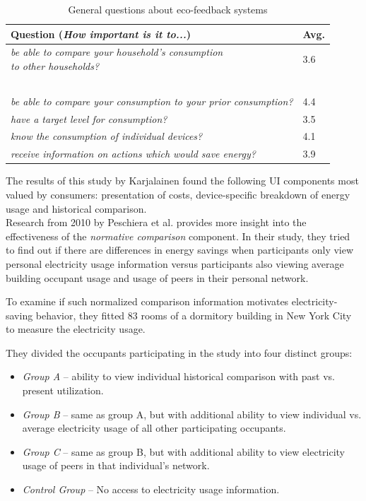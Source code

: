 \documentclass[journal]{vgtc}                %
\begin{document}
\begin{table}
  \caption{General questions about eco-feedback systems}
  \label{prototypesquestions}
  \scriptsize
  \begin{center}
    \begin{tabular}{|ll|}
    \hline
       Question (\textit{How important is it to...}) & Avg. \\ \hline
       \pbox{20cm}{\textit{be able to compare your household's consumption}\\\textit{to other households?}} & 3.6 \\ ~\\[-0.25cm]
       \textit{be able to compare your consumption to your prior consumption?} & 4.4 \\ 
       \textit{have a target level for consumption?} & 3.5 \\ 
       \textit{know the consumption of individual devices?} & 4.1 \\ 
       \textit{receive information on actions which would save energy?} & 3.9 \\
       \hline
    \end{tabular}
  \end{center}
\end{table}

The results of this study by Karjalainen found the following UI components most valued by consumers: presentation of costs, device-specific breakdown of energy usage and historical comparison.
~\\

Research from 2010 by Peschiera et al.\cite{peschiera2010response} provides more insight into the effectiveness of the \textit{normative comparison} component. In their study, they tried to find out if there are differences in energy savings when participants only view personal electricity usage information versus participants also viewing average building occupant usage and usage of peers in their personal network.

To examine if such normalized comparison information motivates electricity-saving behavior, they fitted 83 rooms of a dormitory building in New York City to measure the electricity usage.

They divided the occupants participating in the study into four distinct groups:
\begin{itemize}
\item \textit{Group A} -- ability to view individual historical comparison with past vs. present utilization.
\item \textit{Group B} -- same as group A, but with additional ability to view individual vs. average electricity usage of all other participating occupants.
\item \textit{Group C} -- same as group B, but with additional ability to view electricity usage of peers in that individual's network.
\item \textit{Control Group} -- No access to electricity usage information.
\end{itemize}
\end{document}
